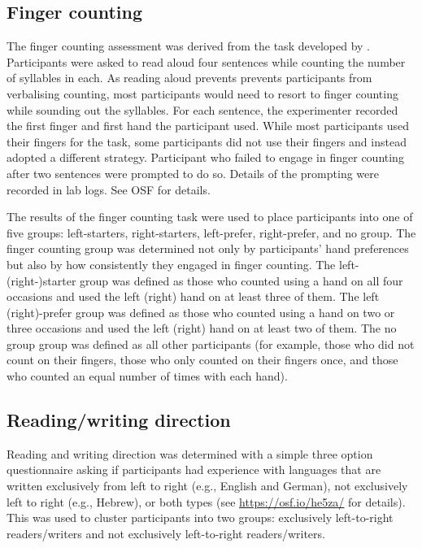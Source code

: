 \documentclass[A4paper,man,floatsintext]{apa6}
\theoremstyle{definition}
\theoremstyle{definition}
\theoremstyle{definition}
\theoremstyle{remark}
\begin{document}
\subsection{Finger counting}\label{finger-counting}

The finger counting assessment was derived from the task developed by
\textcite{Lucidi:2014gn}. Participants were asked to read aloud four
sentences while counting the number of syllables in each. As reading
aloud prevents prevents participants from verbalising counting, most
participants would need to resort to finger counting while sounding out
the syllables. For each sentence, the experimenter recorded the first
finger and first hand the participant used. While most participants used
their fingers for the task, some participants did not use their fingers
and instead adopted a different strategy. Participant who failed to
engage in finger counting after two sentences were prompted to do so.
Details of the prompting were recorded in lab logs. See OSF for details.

The results of the finger counting task were used to place participants
into one of five groups: left-starters, right-starters, left-prefer,
right-prefer, and no group. The finger counting group was determined not
only by participants' hand preferences but also by how consistently they
engaged in finger counting. The left- (right-)starter group was defined
as those who counted using a hand on all four occasions and used the
left (right) hand on at least three of them. The left (right)-prefer
group was defined as those who counted using a hand on two or three
occasions and used the left (right) hand on at least two of them. The no
group group was defined as all other participants (for example, those
who did not count on their fingers, those who only counted on their
fingers once, and those who counted an equal number of times with each
hand).

\subsection{Reading/writing direction}\label{readingwriting-direction}

Reading and writing direction was determined with a simple three option
questionnaire asking if participants had experience with languages that
are written exclusively from left to right (e.g., English and German),
not exclusively left to right (e.g., Hebrew), or both types (see
\url{https://osf.io/he5za/} for details). This was used to cluster
participants into two groups: exclusively left-to-right readers/writers
and not exclusively left-to-right readers/writers.
\end{document}
